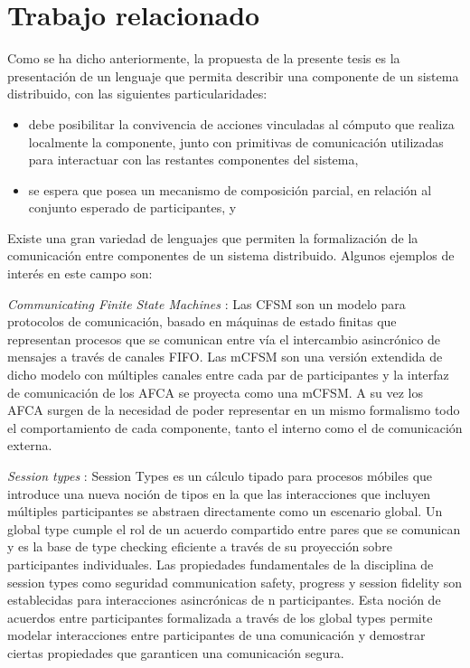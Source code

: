 \section*{Trabajo relacionado}
Como se ha dicho anteriormente, la propuesta de la presente tesis es la presentación de un lenguaje que permita describir una componente de un sistema distribuido, con las siguientes particularidades: 
\begin{itemize}
\item debe posibilitar la convivencia de acciones vinculadas al cómputo que realiza localmente la componente, junto con primitivas de comunicación utilizadas para interactuar con las restantes componentes del sistema,
\item se espera que posea un mecanismo de composición parcial, en relación al conjunto esperado de participantes, y
\end{itemize}

Existe una gran variedad de lenguajes que permiten la formalización de la comunicación entre componentes de un sistema distribuido. Algunos ejemplos de interés en este campo son:

\emph{Communicating Finite State Machines} \cite{brand:jacm-30_2}: Las CFSM son un modelo para protocolos de comunicación, basado en máquinas de estado finitas que representan procesos que se comunican entre vía el intercambio asincrónico de mensajes a través de canales FIFO. Las mCFSM son una versión extendida de dicho modelo con múltiples canales entre cada par de participantes y la interfaz de comunicación de los AFCA se proyecta como una mCFSM. A su vez los AFCA surgen de la necesidad de poder representar en un mismo formalismo todo el comportamiento de cada componente, tanto el interno como el de comunicación externa.

\emph{Session types} \cite{honda:esop98,honda:popl08}: Session Types es un cálculo tipado para procesos móbiles que introduce una nueva noción de tipos en la que las interacciones que incluyen múltiples participantes se abstraen directamente como un escenario global. Un global type cumple el rol de un acuerdo compartido entre pares que se comunican y es la base de type checking eficiente a través de su proyección sobre participantes individuales. Las propiedades fundamentales de la disciplina de session types como seguridad communication safety, progress y session fidelity son establecidas para interacciones asincrónicas de n participantes. Esta noción de acuerdos entre participantes formalizada a través de los global types permite modelar interacciones entre participantes de una comunicación y demostrar ciertas propiedades que garanticen una comunicación segura.

